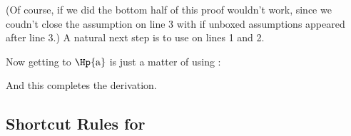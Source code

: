 (Of course, if we did the bottom half of this proof wouldn't work, since we coudn't close the assumption on line 3 with  if unboxed assumptions appeared after line 3.)
A natural next step is to use  on lines 1 and 2.
\begin{gproof}[\label{GQDExampleP}]
\end{gproof}
Now getting to $\Hp{\constant{a}}$ is just a matter of using :
\begin{gproof}[\label{GQDExampleQ}]
\end{gproof}
And this completes the derivation. 

\subsection{Shortcut Rules for \GQD{}}

